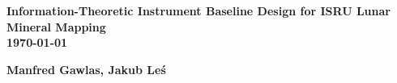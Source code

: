 \documentclass[12pt]{article}
\begin{document}

\setlength{\headsep}{3cm}

\begin{center}
    {\LARGE \textbf{Information-Theoretic Instrument Baseline Design for ISRU Lunar Mineral Mapping}}\\
    {\textbf{\today}}
\end{center}
\begin{center}
    {\textbf{Manfred Gawlas, Jakub Leś}}
\end{center}



\vspace{1cm}

\end{document}
